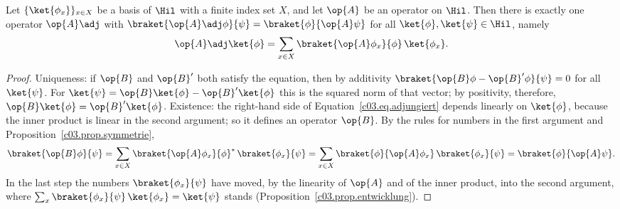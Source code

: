 \begin{proposition}\label{c03.prop.adjungiert}
  Let $\{\ket{\phi_x}\}_{x \in X}$ be a basis of $\Hil$ with a finite index set $X$, and let
  $\op{A}$ be an operator on $\Hil$. Then there is exactly one operator $\op{A}\adj$ with
  $\braket{\op{A}\adj\phi}{\psi} = \braket{\phi}{\op{A}\psi}$ for all
  $\ket{\phi}, \ket{\psi} \in \Hil$, namely
  \begin{equation}\label{c03.eq.adjungiert}
    \op{A}\adj\ket{\phi} = \sum_{x \in X} \braket{\op{A}\phi_x}{\phi}\, \ket{\phi_x} .
  \end{equation}
\end{proposition}
\begin{proof}
  Uniqueness: if $\op{B}$ and $\op{B}'$ both satisfy the equation, then by additivity
  $\braket{\op{B}\phi - \op{B}'\phi}{\psi} = 0$ for all $\ket{\psi}$. For
  $\ket{\psi} = \op{B}\ket{\phi} - \op{B}'\ket{\phi}$ this is the squared norm of that vector;
  by positivity, therefore, $\op{B}\ket{\phi} = \op{B}'\ket{\phi}$. Existence: the right-hand
  side of Equation~\eqref{c03.eq.adjungiert} depends linearly on $\ket{\phi}$, because the inner
  product is linear in the second argument; so it defines an operator $\op{B}$. By the rules for
  numbers in the first argument and Proposition~\ref{c03.prop.symmetrie},
  \begin{equation}\label{c03.eq.adjungiert-beweis}
    \braket{\op{B}\phi}{\psi}
    = \sum_{x \in X} \braket{\op{A}\phi_x}{\phi}^*\, \braket{\phi_x}{\psi}
    = \sum_{x \in X} \braket{\phi}{\op{A}\phi_x}\, \braket{\phi_x}{\psi}
    = \braket{\phi}{\op{A}\psi} .
  \end{equation}
  In the last step the numbers $\braket{\phi_x}{\psi}$ have moved, by the linearity of $\op{A}$
  and of the inner product, into the second argument, where
  $\sum_x \braket{\phi_x}{\psi}\, \ket{\phi_x} = \ket{\psi}$ stands
  (Proposition~\ref{c03.prop.entwicklung}).
\end{proof}

